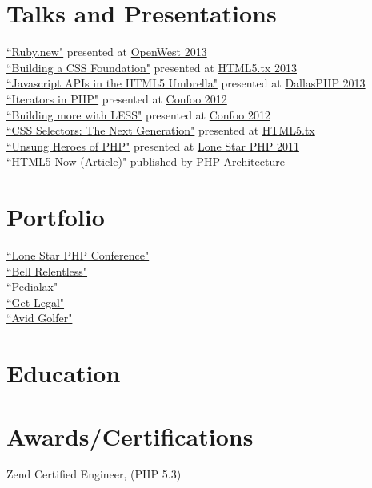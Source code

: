 \documentclass{resume}
\begin{document}
\section{Talks and Presentations}

\begin{spacing}{1.25}
\href{https://speakerdeck.com/jakefolio/ruby-dot-new}{``Ruby.new"} presented at \href{http://openwest.org}{OpenWest 2013}
\\
\href{https://speakerdeck.com/jakefolio/building-a-css-foundation}{``Building a CSS Foundation"} presented at \href{http://html5tx.com}{HTML5.tx 2013}
\\
\href{https://speakerdeck.com/jakefolio/javascript-apis-in-the-html5-umbrella}{``Javascript APIs in the HTML5 Umbrella"} presented at \href{http://dallasphp.com}{DallasPHP 2013}
\\
\href{http://speakerdeck.com/u/jakefolio/p/iterators-in-php}{``Iterators in PHP"} presented at \href{http://confoo.ca}{Confoo 2012}
\\
\href{http://speakerdeck.com/u/jakefolio/p/building-more-with-less-css}{``Building more with LESS"} presented at \href{http://confoo.ca/}{Confoo 2012}
\\
\href{http://speakerdeck.com/u/jakefolio/p/css-selectors-the-next-generation}{``CSS Selectors: The Next Generation"} presented at \href{http://html5tx.com}{HTML5.tx}
\\
\href{http://speakerdeck.com/u/jakefolio/p/unsung-heroes-of-php}{``Unsung Heroes of PHP"} presented at \href{http://lonestarphp.com.com/}{Lone Star PHP 2011}
\\
\href{http://www.phparch.com/magazine/2011-2/october/}{``HTML5 Now (Article)"} published by \href{http://phparch.com/}{PHP Architecture}
\\
\end{spacing}

\section{Portfolio}

\begin{spacing}{1.25}
\href{http://lonestarphp.com/}{``Lone Star PHP Conference"}
\\
\href{http://www.bell525supermedium.net/}{``Bell Relentless"}
\\
\href{http://pedia-lax.com/}{``Pedialax"}
\\
\href{http://www.getlegal.com/}{``Get Legal"}
\\
\href{http://myavidgolfer.com/}{``Avid Golfer"}
\end{spacing}

\section{Education}


\section{Awards/Certifications}

Zend Certified Engineer, (PHP 5.3)
\end{document}

